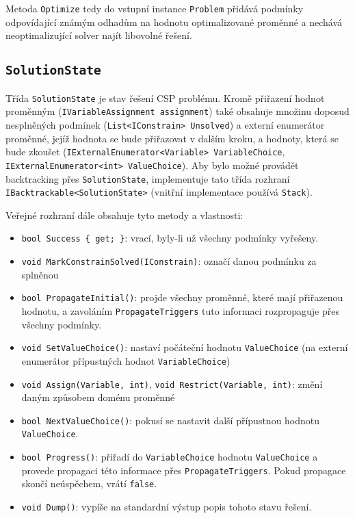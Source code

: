 \documentclass[a4paper]{article}
\begin{document}
Metoda \texttt{Optimize} tedy do vstupní instance \texttt{Problem} přidává
podmínky odpovídající známým odhadům na hodnotu optimalizované proměnné a
nechává neoptimalizující solver najít libovolné řešení.

\subsection{\texttt{SolutionState}}
Třída \texttt{SolutionState} je stav řešení CSP problému. Kromě přiřazení hodnot
proměnným (\texttt{IVariableAssignment assignment}) také obsahuje množinu doposud nesplněných podmínek
(\texttt{List<IConstrain> Unsolved}) a externí enumerátor proměnné, jejíž
hodnota se bude přiřazovat v dalším kroku, a hodnoty, která se bude zkoušet (\texttt{IExternalEnumerator<Variable>
VariableChoice}, \texttt{IExternalEnumerator<int> ValueChoice}).
Aby bylo možné provádět backtracking přes \texttt{SolutionState}, implementuje
tato třída rozhraní \texttt{IBacktrackable<SolutionState>} (vnitřní implementace
používá \texttt{Stack}).

Veřejné rozhraní dále obsahuje tyto metody a vlastnosti:
\begin{itemize}
\item \texttt{bool Success \{ get; \}}: vrací, byly-li už všechny
	podmínky vyřešeny.
\item \texttt{void MarkConstrainSolved(IConstrain)}: označí danou podmínku za
	splněnou
\item \texttt{bool PropagateInitial()}: projde všechny proměnné, které mají
	přiřazenou hodnotu, a zavoláním \texttt{PropagateTriggers} tuto informaci
	rozpropaguje přes všechny podmínky.
\item \texttt{void SetValueChoice()}: nastaví počáteční hodnotu
	\texttt{ValueChoice} (na externí enumerátor přípustných hodnot
	\texttt{VariableChoice})
\item \texttt{void Assign(Variable, int)}, \texttt{void Restrict(Variable,
	int)}: změní daným způsobem doménu proměnné
\item \texttt{bool NextValueChoice()}: pokusí se nastavit další přípustnou
	hodnotu \texttt{ValueChoice}.
\item \texttt{bool Progress()}: přiřadí do \texttt{VariableChoice} hodnotu
	\texttt{ValueChoice} a provede propagaci této informace přes
	\texttt{PropagateTriggers}. Pokud propagace skončí neúspěchem, vrátí
	\texttt{false}.
\item \texttt{void Dump()}: vypíše na standardní výstup popis tohoto stavu
	řešení.
\end{itemize}
\end{document}
